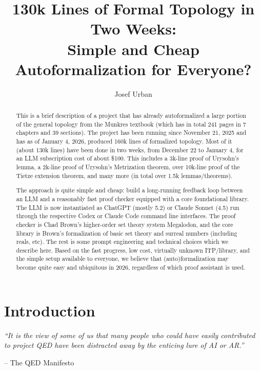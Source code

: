 \documentclass[a4paper,UKenglish,cleveref, autoref, thm-restate]{lipics-v2021}
\title{130k Lines of Formal Topology in Two Weeks:\\Simple and Cheap Autoformalization for Everyone?}
\author{Josef Urban}{AI4REASON and University of Gothenburg}{josef.urban@gmail.com}{}{}
\newenvironment{mypar}[2]
  {\begin{list}{}%
    {\setlength\leftmargin{4mm}
    \setlength\rightmargin{4mm}}
    \item[]}
  {\end{list}}
\begin{document}
\maketitle

  \begin{abstract}
    This is a brief description of a project that has already
    autoformalized a large portion of the general topology from the
    Munkres textbook (which has in total 241 pages in 7 chapters and
    39 sections). The project has been running since November 21, 2025
    and has as of January 4, 2026, produced 160k lines of formalized
    topology. Most of it (about 130k lines) have been done in two weeks,
    from December 22 to January 4, for an LLM subscription
    cost of about \$100. This includes a 3k-line proof of Urysohn's
    lemma, a 2k-line proof of Urysohn's Metrization theorem, over 10k-line proof of the Tietze extension theorem, and many
    more (in total over 1.5k lemmas/theorems).

    The approach is quite
    simple and cheap: build a long-running feedback loop between an
    LLM and a reasonably fast proof checker equipped with a core
    foundational library. The LLM is now instantiated as ChatGPT
    (mostly 5.2) or Claude Sonnet (4.5) run through the respective
    Codex or Claude Code command line interfaces. The proof checker is
    Chad Brown's higher-order set theory system Megalodon, and the
    core library is Brown's formalization of basic set theory and
    surreal numbers (including reals, etc). The rest is some
    prompt engineering and technical choices which we describe
    here. Based on the fast progress, low cost, virtually unknown ITP/library, and the simple setup
    available to everyone, we believe that (auto)formalization may
    become quite easy and ubiquitous in 2026, regardless of which proof assistant is used.
%
%
%

 


\end{abstract}



\section{Introduction}

\begin{mypar}{10mm}{5mm}
{\it
``It is the view of some of us that many people who could have easily contributed to project QED have been distracted away by the enticing lure of AI or AR.'' 

{\hfill\rm-- The QED Manifesto}
}
\end{mypar}
\end{document}
